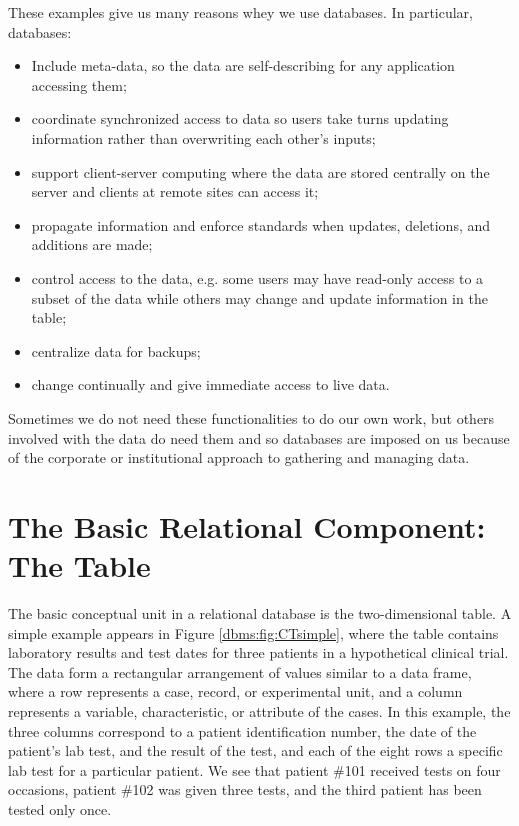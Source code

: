 These examples give us many reasons whey we use databases.
In particular, databases:
\begin{itemize}
  \item Include meta-data, so the data are self-describing for any
  application 
  accessing them;
  \item coordinate synchronized access to data so users take turns
  updating information rather than overwriting each other's inputs;
  \item support client-server computing where the data are stored centrally
  on the server and clients at remote sites can access it;
  \item propagate information and enforce standards when updates, deletions,
        and additions are made;
   \item control access to the data, e.g. some users may have read-only access
   to a subset of the data while others may change and update information
   in the table;
   \item centralize data for backups;
   \item change continually and give immediate access to live data. 
\end{itemize}

Sometimes we do not need these functionalities to do our own work, but
others involved with the data do need them and so databases are 
imposed on us because of the corporate or institutional approach to
gathering and managing data.

\section{The Basic Relational Component: The Table}

The basic conceptual unit in a relational database is the two-dimensional table.
A simple example appears in Figure \ref{dbms:fig:CTsimple}, where the
table contains laboratory results and test dates for three 
patients in a hypothetical clinical trial. 
The data form a rectangular arrangement of values similar to a data frame,
where a row represents a case, record, or experimental unit,
and a column represents a variable, characteristic, or attribute of the cases.
In this example, the three columns correspond to a patient identification
number, the date of the patient's lab test, and the result of the test,
and each of the eight rows a specific lab test for a particular patient.
We see that patient \#101 received tests on four occasions, patient \#102 was 
given three tests, and the third patient has been tested only once.


